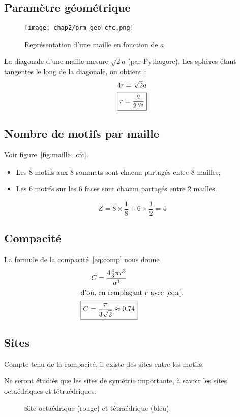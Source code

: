 \subsection{Paramètre géométrique}
\begin{figure}
    \centering
    \texttt{[image: chap2/prm\_geo\_cfc.png]}
    \caption{Représentation d'une maille en fonction de $a$}\label{fig:prm_geo_cfc}
\end{figure}

La diagonale d'une maille mesure $\sqrt{2}a$ (par Pythagore).
Les sphères étant tangentes le long de la diagonale, on obtient :
\begin{gather}
    4r = \sqrt{2}a \\
    \boxed{r = \frac{a}{2^{\sfrac{3}{2}}}} \label{eq:r}
\end{gather}
\subsection{Nombre de motifs par maille}
Voir figure~\ref{fig:maille_cfc}.
\begin{itemize}
    \item Les 8 motifs aux 8 sommets sont chacun partagés
        entre 8 mailles;
    \item Les 6 motifs sur les 6 faces sont chacun partagés
        entre 2 mailles.
\end{itemize}
\begin{equation}
    Z = 8 \times \frac{1}{8} + 6 \times \frac{1}{2} = 4
\end{equation}
\subsection{Compacité}
La formule de la compacité~\ref{eq:comp} nous donne
\begin{gather}
    C = \frac{4 \frac{4}{3} \pi r^3}{a^3}\\
    \intertext{d'où, en remplaçant $r$ avec~\ref{eq:r},}
    \boxed{C = \frac{\pi}{3\sqrt{2}} \approx 0.74}
\end{gather}

\subsection{Sites}
Compte tenu de la compacité, il existe des sites entre les motifs.
\begin{rem}
    Ne seront étudiés que les sites de symétrie importante,
    à savoir les sites octaédriques et tétraédriques.
\end{rem}
\begin{figure}
    \centering
    
    \caption[Sites d'une structure cfc]
    {Site octaédrique (rouge) et tétraédrique (bleu)}\label{fig:2_cfc_sites}
\end{figure}
